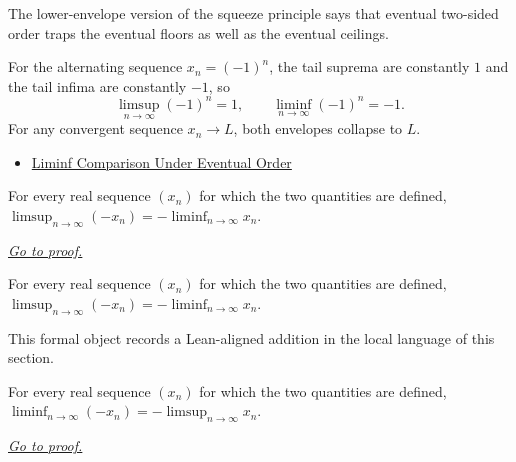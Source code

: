 \begin{remark*}[Interpretation]
The lower-envelope version of the squeeze principle says that eventual
two-sided order traps the eventual floors as well as the eventual ceilings.


For the alternating sequence $x_n=(-1)^n$, the tail suprema are constantly
$1$ and the tail infima are constantly $-1$, so
\[
  \limsup_{n\to\infty}(-1)^n=1,
  \qquad
  \liminf_{n\to\infty}(-1)^n=-1.
\]
For any convergent sequence $x_n\to L$, both envelopes collapse to $L$.
\end{remark*}

\begin{dependencies}
\begin{itemize}
  \item \hyperref[thm:liminf-comparison-under-eventual-order]{Liminf Comparison Under Eventual Order}
\end{itemize}
\end{dependencies}

\begin{theorem}
\label{thm:limsup-neg-eq-neg-liminf}
For every real sequence $(x_n)$ for which the two quantities are defined, $\limsup_{n\to\infty}(-x_n)=-\liminf_{n\to\infty}x_n$.

\smallskip
\noindent
\hyperref[prf:limsup-neg-eq-neg-liminf]{\textit{Go to proof.}}
\end{theorem}

\begin{remark*}
For every real sequence $(x_n)$ for which the two quantities are defined, $\limsup_{n\to\infty}(-x_n)=-\liminf_{n\to\infty}x_n$.
\end{remark*}

\begin{remark*}[Interpretation]
This formal object records a Lean-aligned addition in the local language of this section.
\end{remark*}

\begin{dependencies}
\NoLocalDependencies
\end{dependencies}
\begin{theorem}
\label{thm:liminf-neg-eq-neg-limsup}
For every real sequence $(x_n)$ for which the two quantities are defined, $\liminf_{n\to\infty}(-x_n)=-\limsup_{n\to\infty}x_n$.

\smallskip
\noindent
\hyperref[prf:liminf-neg-eq-neg-limsup]{\textit{Go to proof.}}
\end{theorem}

